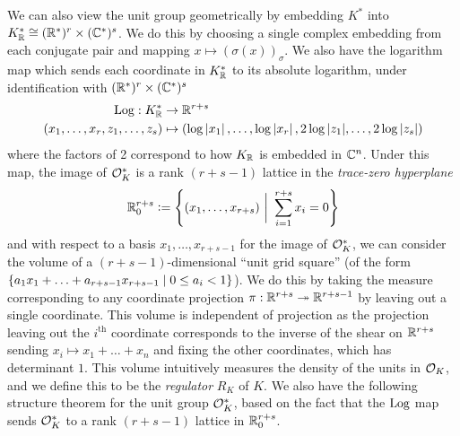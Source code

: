 \documentclass[11pt]{report}
\begin{document}


We can also view the unit group geometrically by embedding $K^*$ into $K_{\mathbb{R}}^* \cong (\mathbb{R}^*)^r \times (\mathbb{C}^*)^s$. We do this by choosing a single complex embedding from each conjugate pair and mapping $x \mapsto (\sigma(x))_{\sigma}$. We also have the logarithm map which sends each coordinate in $K_{\mathbb{R}}^*$ to its absolute logarithm, under identification with $(\mathbb{R}^*)^r \times (\mathbb{C}^*)^s$
\begin{align*}
    \operatorname{Log} : K_{\mathbb{R}}^* &\to \mathbb{R}^{r + s} \\
    (x_1, \ldots, x_r, z_1, \ldots, z_s) &\mapsto (\log\left| x_1 \right|, \ldots, \log\left| x_r \right|, 2\log{\left| z_1 \right|}, \ldots, 2\log{\left| z_s \right|})
\end{align*}
where the factors of 2 correspond to how $K_{\mathbb{R}}$ is embedded in $\mathbb{C}^n$. 
Under this map, the image of $\mathcal{O}_K^*$ is a rank $(r + s - 1)$ lattice in the \emph{trace-zero hyperplane}
$$
    \mathbb{R}_0^{r + s} \vcentcolon= \left\{  (x_1, \ldots, x_{r + s}) \ \bigg| \ \sum_{i = 1}^{r + s}x_i = 0  \right\}
$$
and with respect to a basis $x_1, \ldots, x_{r + s - 1}$ for the image of $\mathcal{O}_K^*$, we can consider the volume of a $(r + s - 1)$-dimensional ``unit grid square'' (of the form $\left\{  a_1x_1 + \ldots + a_{r + s - 1}x_{r + s - 1} \mid 0 \leq a_i < 1  \right\}$). We do this by taking the measure corresponding to any coordinate projection $\pi : \mathbb{R}^{r + s} \twoheadrightarrow \mathbb{R}^{r + s - 1}$ by leaving out a single coordinate. This volume is independent of projection as the projection leaving out the $i^{\text{th}}$ coordinate corresponds to the inverse of the shear on $\mathbb{R}^{r + s}$ sending $x_i \mapsto x_1 + \ldots + x_n$ and fixing the other coordinates, which has determinant $1$. This volume intuitively measures the density of the units in $\mathcal{O}_K$, and we define this to be the \emph{regulator} $R_K$ of $K$. We also have the following structure theorem for the unit group $\mathcal{O}_K^*$, based on the fact that the $\operatorname{Log}$ map sends $\mathcal{O}_K^*$ to a rank $(r + s - 1)$ lattice in $\mathbb{R}_0^{r + s}$.
\end{document}
